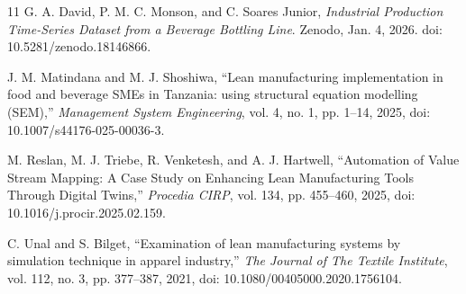 \documentclass[journal]{IEEEtran}
\begin{document}
\begin{thebibliography}{11}
G. A. David, P. M. C. Monson, and C. Soares Junior, \emph{Industrial Production Time-Series Dataset from a Beverage Bottling Line}. Zenodo, Jan. 4, 2026. doi: 10.5281/zenodo.18146866.

J. M. Matindana and M. J. Shoshiwa, ``Lean manufacturing implementation in food and beverage SMEs in Tanzania: using structural equation modelling (SEM),'' \emph{Management System Engineering}, vol. 4, no. 1, pp. 1--14, 2025, doi: 10.1007/s44176-025-00036-3.

M. Reslan, M. J. Triebe, R. Venketesh, and A. J. Hartwell, ``Automation of Value Stream Mapping: A Case Study on Enhancing Lean Manufacturing Tools Through Digital Twins,'' \emph{Procedia CIRP}, vol. 134, pp. 455--460, 2025, doi: 10.1016/j.procir.2025.02.159.

C. Unal and S. Bilget, ``Examination of lean manufacturing systems by simulation technique in apparel industry,'' \emph{The Journal of The Textile Institute}, vol. 112, no. 3, pp. 377--387, 2021, doi: 10.1080/00405000.2020.1756104.

\end{thebibliography}
\end{document}

